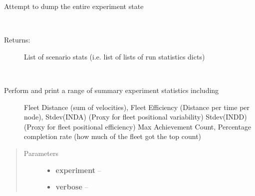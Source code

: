 \documentclass[letterpaper,10pt,english]{sphinxmanual}
\begin{document}
\begin{fulllineitems}
\begin{fulllineitems}
\end{fulllineitems}


\begin{fulllineitems}
\label{index:polybos.ExperimentManager.dump_self}
Attempt to dump the entire experiment state

\end{fulllineitems}


\begin{fulllineitems}
\label{index:polybos.ExperimentManager.generate_simulation_stats}~\begin{description}
\item[{Returns:}] \leavevmode
List of scenario stats (i.e. list of lists of run statistics dicts)

\end{description}

\end{fulllineitems}


\begin{fulllineitems}
\label{index:polybos.ExperimentManager.print_stats}~\begin{description}
\item[{Perform and print a range of summary experiment statistics including}] \leavevmode
Fleet Distance (sum of velocities),
Fleet Efficiency (Distance per time per node),
Stdev(INDA) (Proxy for fleet positional variability)
Stdev(INDD) (Proxy for fleet positional efficiency)
Max Achievement Count,
Percentage completion rate (how much of the fleet got the top count)

\end{description}
\begin{quote}\begin{description}
\item[{Parameters}] \leavevmode\begin{itemize}
\item {} 
\textbf{experiment} -- 

\item {} 
\textbf{verbose} -- 


\end{itemize}
\end{description}
\end{quote}
\end{fulllineitems}
\end{fulllineitems}
\end{document}
